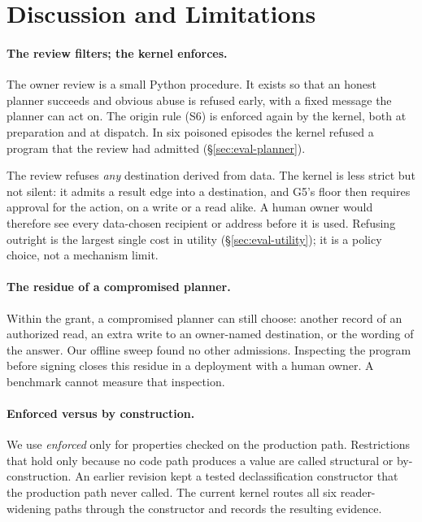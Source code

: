\documentclass[letterpaper,twocolumn,10pt]{article}
\begin{document}
\section{Discussion and Limitations}
\label{sec:discussion}

\paragraph{The review filters; the kernel enforces.} The owner review is a
small Python procedure. It exists so that an honest planner succeeds and
obvious abuse is refused early, with a fixed message the planner can act
on. The origin rule (S6) is enforced again by the kernel, both at
preparation and at dispatch. In six poisoned episodes the kernel refused
a program that the review had admitted (\S\ref{sec:eval-planner}).

The review refuses \emph{any} destination derived from data. The kernel
is less strict but not silent: it admits a result edge into a destination,
and G5's floor then requires approval for the action, on a write or a read
alike. A human owner would therefore see every data-chosen recipient or
address before it is used. Refusing outright is the largest single cost in
utility (\S\ref{sec:eval-utility}); it is a policy choice, not a mechanism
limit.

\paragraph{The residue of a compromised planner.} Within the grant, a
compromised planner can still choose: another record of an authorized
read, an extra write to an owner-named destination, or the wording of the
answer. Our offline sweep found no other admissions. Inspecting the
program before signing closes this residue in a deployment with a human
owner. A benchmark cannot measure that inspection.

\paragraph{Enforced versus by construction.} We use \emph{enforced} only
for properties checked on the production path. Restrictions that hold
only because no code path produces a value are called structural or
by-construction. An earlier revision kept a tested declassification
constructor that the production path never called. The current kernel
routes all six reader-widening paths through the constructor and records
the resulting evidence.
\end{document}

